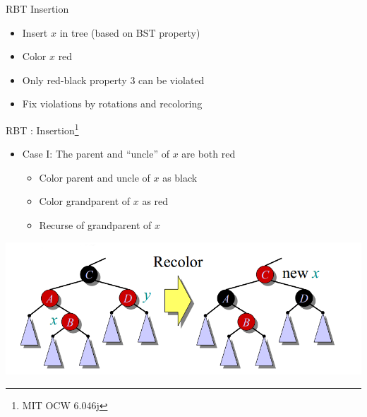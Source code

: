 \documentclass{beamer}
\begin{document}
\begin{frame}{RBT Insertion }
    \begin{itemize}
        \item Insert $x$ in tree (based on BST property)
        \item Color $x$ red
        \item Only red-black property $3$ can be violated
        \item Fix violations by rotations and recoloring
    \end{itemize}
\end{frame}

\begin{frame}{RBT : Insertion\footnote{MIT OCW 6.046j}}
    \begin{itemize}
        \item Case I: The parent and ``uncle'' of $x$ are both red
        \begin{itemize}
            \item Color parent and uncle of $x$ as black
            \item Color grandparent of $x$ as red
            \item Recurse of grandparent of $x$
        \end{itemize}
    \end{itemize}
    \begin{center}
        \includegraphics[scale=0.4]{rbtInsertEg1.png}
    \end{center}
\end{frame}
\end{document}
